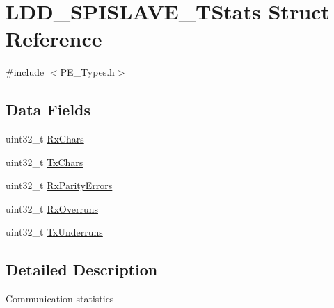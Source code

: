 \hypertarget{struct_l_d_d___s_p_i_s_l_a_v_e___t_stats}{\section{L\-D\-D\-\_\-\-S\-P\-I\-S\-L\-A\-V\-E\-\_\-\-T\-Stats Struct Reference}
\label{struct_l_d_d___s_p_i_s_l_a_v_e___t_stats}
}


{\ttfamily \#include $<$P\-E\-\_\-\-Types.\-h$>$}

\subsection*{Data Fields}
\begin{DoxyCompactItemize}
\item 
uint32\-\_\-t \hyperlink{struct_l_d_d___s_p_i_s_l_a_v_e___t_stats_a91f6acf13143110968772d344d352fc6}{Rx\-Chars}
\item 
uint32\-\_\-t \hyperlink{struct_l_d_d___s_p_i_s_l_a_v_e___t_stats_ab674ba50318e198a1ee9dea0692ce239}{Tx\-Chars}
\item 
uint32\-\_\-t \hyperlink{struct_l_d_d___s_p_i_s_l_a_v_e___t_stats_abef442625b92cf52c2ff04edf6894dd3}{Rx\-Parity\-Errors}
\item 
uint32\-\_\-t \hyperlink{struct_l_d_d___s_p_i_s_l_a_v_e___t_stats_a82edd5dc5e18e7cd6a047d0efbda97ae}{Rx\-Overruns}
\item 
uint32\-\_\-t \hyperlink{struct_l_d_d___s_p_i_s_l_a_v_e___t_stats_ab2e5342f4a486b20ae9306f451451a77}{Tx\-Underruns}
\end{DoxyCompactItemize}


\subsection{Detailed Description}
Communication statistics 

